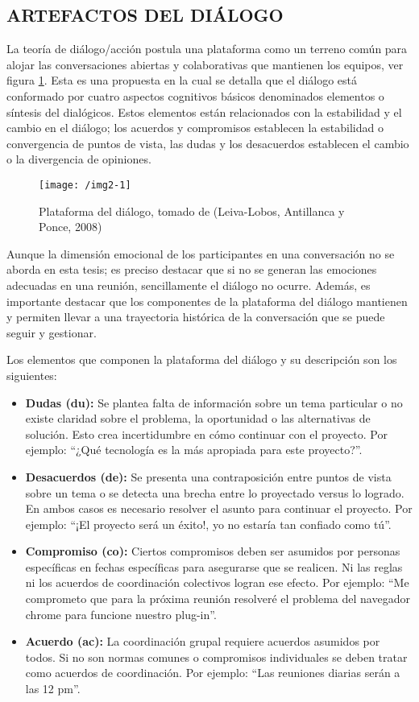 \subsection{ARTEFACTOS DEL DIÁLOGO}

La teoría de diálogo/acción  postula una plataforma como un terreno común para alojar las conversaciones abiertas y colaborativas que mantienen los equipos, ver figura \ref{img2-1}. Esta es una propuesta en la cual se detalla que el diálogo está conformado por cuatro aspectos cognitivos básicos denominados elementos o síntesis del dialógicos. Estos elementos están relacionados con la estabilidad y el cambio en el diálogo; los acuerdos y compromisos establecen la estabilidad o convergencia de puntos de vista, las dudas y los desacuerdos establecen el cambio o la divergencia de opiniones.

\begin{figure}[h]
\centering
\texttt{[image: /img2-1]}
\caption{Plataforma del diálogo, tomado de (Leiva-Lobos, Antillanca y Ponce, 2008)} 
\label{img2-1}
\end{figure}

Aunque la dimensión emocional de los participantes en una conversación no se aborda en esta tesis; es preciso destacar que si no se generan las emociones adecuadas en una reunión, sencillamente el diálogo no ocurre. Además, es importante destacar que los componentes de la plataforma del diálogo mantienen y permiten llevar a una trayectoria histórica de la conversación que se puede seguir y gestionar.

Los elementos que componen la plataforma del diálogo y su descripción son los siguientes:

\begin{itemize}
	\item \textbf{Dudas (du):} Se plantea falta de información sobre un tema particular o no existe claridad sobre el problema, la oportunidad o las alternativas de solución. Esto crea incertidumbre en cómo continuar con el proyecto. Por ejemplo: “¿Qué tecnología es la más apropiada para este proyecto?”.
	\item \textbf{Desacuerdos (de):} Se presenta una contraposición entre puntos de vista sobre un tema o se detecta una brecha entre lo proyectado versus lo logrado. En ambos casos es necesario resolver el asunto para continuar el proyecto. Por ejemplo: “¡El proyecto será un éxito!,  yo no estaría tan confiado como tú”.
	\item \textbf{Compromiso (co):} Ciertos compromisos deben ser asumidos por personas específicas en fechas específicas para asegurarse que se realicen. Ni las reglas ni los acuerdos de coordinación colectivos logran ese efecto.  Por ejemplo: “Me comprometo que para la próxima reunión resolveré el problema del navegador chrome para funcione nuestro plug-in”.
	\item \textbf{Acuerdo (ac):} La coordinación grupal requiere acuerdos asumidos por todos. Si no son normas comunes o compromisos individuales se deben tratar como acuerdos de coordinación.  Por ejemplo: “Las reuniones diarias serán a las 12 pm”.

\end{itemize}

